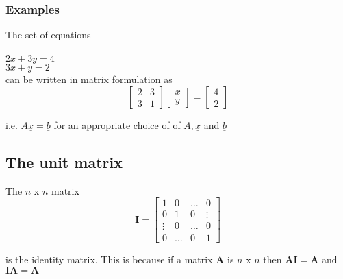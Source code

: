\documentclass[12pt,a4paper]{article}
\theoremstyle{regla}
\theoremstyle{remark}
\theoremstyle{definition}
\theoremstyle{nonumberbreak}
\begin{document}
\subsubsection{Examples}
\begin{xmpl}
The set of equations\\
\\
$2x+3y=4$ \\
$3x+y=2$ \\

can be written in matrix formulation as\\

$$\begin{bmatrix}
2 & 3  \\
3 & 1 
\end{bmatrix}
\begin{bmatrix}
x \\
y
\end{bmatrix}
=
\begin{bmatrix}
4 \\
2
\end{bmatrix}
$$

i.e. $A\underline{x} = \underline{b}$ for an appropriate choice of of $A, \underline{x}$ and $\underline{b}$
\end{xmpl}

\subsection{The unit matrix}
\begin{fbox}
\begin{minipage}{0.97\textwidth}
The $n$ x $n$ matrix \\

\begin{equation*}
\mathbf{I}
=
\left[
\begin{array}{cccc}
  1 & 0 & \ldots & 0 \\
  0 & 1 & 0  & \vdots \\
  \vdots & 0  & \dots & 0 \\
  0 & \ldots & 0 & 1
\end{array} \right]
\end{equation*}

is the identity matrix. This is because if a matrix $\mathbf{A}$ is $n$ x $n$ then $\mathbf{A} \mathbf{I} = \mathbf{A}$ and $\mathbf{I} \mathbf{A}  = 
\mathbf{A}$
\end{minipage}
\end{fbox}
\end{document}
